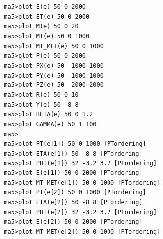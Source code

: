 \documentclass[a4paper, 10pt]{article}
\begin{document}
\texttt{ }\texttt{ }\texttt{ma5>plot E(e)        50 0 2000\\
}
\texttt{ }\texttt{ }\texttt{ma5>plot ET(e)       50 0 2000\\
}
\texttt{ }\texttt{ }\texttt{ma5>plot M(e)        50 0 20\\
}
\texttt{ }\texttt{ }\texttt{ma5>plot MT(e)       50 0 1000\\
}
\texttt{ }\texttt{ }\texttt{ma5>plot MT\_MET(e)   50 0 1000\\
}
\texttt{ }\texttt{ }\texttt{ma5>plot P(e)        50 0 2000\\
}
\texttt{ }\texttt{ }\texttt{ma5>plot PX(e)       50 -1000 1000\\
}
\texttt{ }\texttt{ }\texttt{ma5>plot PY(e)       50 -1000 1000\\
}
\texttt{ }\texttt{ }\texttt{ma5>plot PZ(e)       50 -2000 2000\\
}
\texttt{ }\texttt{ }\texttt{ma5>plot R(e)        50 0 10\\
}
\texttt{ }\texttt{ }\texttt{ma5>plot Y(e)        50 -8 8\\
}
\texttt{ }\texttt{ }\texttt{ma5>plot BETA(e)     50 0 1.2\\
}
\texttt{ }\texttt{ }\texttt{ma5>plot GAMMA(e)    50 1 100\\
}
\texttt{ }\texttt{ }\texttt{ma5>\\
}
\texttt{ }\texttt{ }\texttt{ma5>plot PT(e[1])      50 0 1000 [PTordering]\\
}
\texttt{ }\texttt{ }\texttt{ma5>plot ETA(e[1])     50 -8 8 [PTordering]\\
}
\texttt{ }\texttt{ }\texttt{ma5>plot PHI(e[1])     32 -3.2 3.2 [PTordering]\\
}
\texttt{ }\texttt{ }\texttt{ma5>plot E(e[1])       50 0 2000 [PTordering]\\
}
\texttt{ }\texttt{ }\texttt{ma5>plot MT\_MET(e[1])  50 0 1000 [PTordering]\\
}
\texttt{ }\texttt{ }\texttt{ma5>plot PT(e[2])      50 0 1000 [PTordering]\\
}
\texttt{ }\texttt{ }\texttt{ma5>plot ETA(e[2])     50 -8 8 [PTordering]\\
}
\texttt{ }\texttt{ }\texttt{ma5>plot PHI(e[2])     32 -3.2 3.2 [PTordering]\\
}
\texttt{ }\texttt{ }\texttt{ma5>plot E(e[2])       50 0 2000 [PTordering]\\
}
\texttt{ }\texttt{ }\texttt{ma5>plot MT\_MET(e[2])  50 0 1000 [PTordering]\\
}
\end{document}
